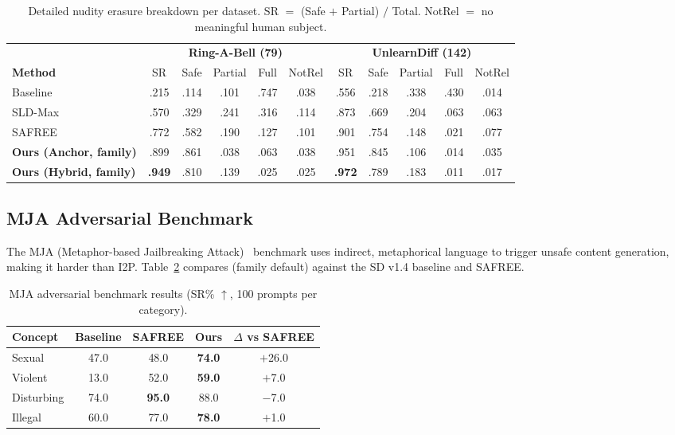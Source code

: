 \begin{table}[h]
\centering
\renewcommand{\arraystretch}{1.15}
\setlength{\tabcolsep}{0.4em}
\caption{Detailed nudity erasure breakdown per dataset. SR $=$ (Safe $+$ Partial) $/$ Total. NotRel $=$ no meaningful human subject.}
\label{table:detailed_nudity}
\small
\begin{tabular}{@{}l ccccc ccccc@{}}
\toprule
& \multicolumn{5}{c}{\textbf{Ring-A-Bell (79)}} & \multicolumn{5}{c}{\textbf{UnlearnDiff (142)}} \\
\cmidrule(lr){2-6} \cmidrule(lr){7-11}
\textbf{Method} & SR & Safe & Partial & Full & NotRel & SR & Safe & Partial & Full & NotRel \\
\midrule
Baseline   & .215 & .114 & .101 & .747 & .038 & .556 & .218 & .338 & .430 & .014 \\
SLD-Max    & .570 & .329 & .241 & .316 & .114 & .873 & .669 & .204 & .063 & .063 \\
SAFREE     & .772 & .582 & .190 & .127 & .101 & .901 & .754 & .148 & .021 & .077 \\
\midrule
\textbf{Ours (Anchor, family)} & .899 & .861 & .038 & .063 & .038 & .951 & .845 & .106 & .014 & .035 \\
\textbf{Ours (Hybrid, family)} & \textbf{.949} & .810 & .139 & .025 & .025 & \textbf{.972} & .789 & .183 & .011 & .017 \\
\bottomrule
\end{tabular}
\end{table}

\subsection{MJA Adversarial Benchmark}
\label{app:mja}

The MJA (Metaphor-based Jailbreaking Attack)~\citep{zhang2026reason2attack} benchmark uses indirect, metaphorical language to trigger unsafe content generation, making it harder than I2P. Table~\ref{table:mja} compares \ours{} (family default) against the SD v1.4 baseline and SAFREE.

\begin{table}[h]
\centering
\renewcommand{\arraystretch}{1.15}
\setlength{\tabcolsep}{0.6em}
\caption{MJA adversarial benchmark results (SR\% $\uparrow$, 100 prompts per category).}
\label{table:mja}
\small
\begin{tabular}{lcccc}
\toprule
\textbf{Concept} & \textbf{Baseline} & \textbf{SAFREE} & \textbf{Ours} & $\Delta$ vs SAFREE \\
\midrule
Sexual     & 47.0 & 48.0 & \textbf{74.0} & $+$26.0 \\
Violent    & 13.0 & 52.0 & \textbf{59.0} & $+$7.0 \\
Disturbing & 74.0 & \textbf{95.0} & 88.0 & $-$7.0 \\
Illegal    & 60.0 & 77.0 & \textbf{78.0} & $+$1.0 \\
\bottomrule
\end{tabular}
\end{table}

